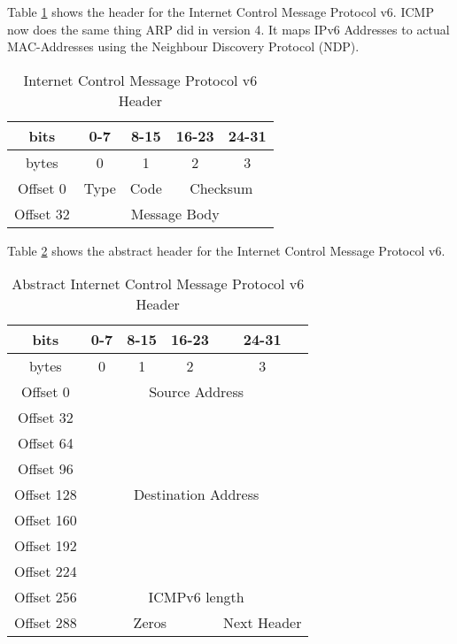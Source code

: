 Table \ref{icmpv6-header} shows the header for the Internet Control Message Protocol v6. ICMP now does the same thing ARP did in version 4. It maps IPv6 Addresses to actual MAC-Addresses using the Neighbour Discovery Protocol (NDP).

\begin{table}[H]
	\centering
	\label{icmpv6-header}
	\begin{tabular}{|c|c|c|c|c|}
		\hline
		bits      & 0-7  & 8-15 & 16-23         & 24-31         \\ \hline
		bytes     & 0    & 1    & 2             & 3             \\ \hline
		Offset 0  & Type & Code & \multicolumn{2}{c|}{Checksum} \\ \hline
		Offset 32 & \multicolumn{4}{c|}{Message Body}           \\ \hline
	\end{tabular}
	\caption{Internet Control Message Protocol v6 Header}
\end{table}

Table \ref{icmpv6-abstract-header} shows the abstract header for the Internet Control Message Protocol v6.
\begin{table}[H]
	\centering
	\label{icmpv6-abstract-header}
	\begin{tabular}{|c|c|c|c|c|}
		\hline
		bits       & 0-7        & 8-15       & 16-23       & 24-31             \\ \hline
		bytes      & 0          & 1          & 2           & 3                 \\ \hline
		Offset 0   & \multicolumn{4}{c|}{Source Address}      \\ \cline{1-1}
		Offset 32  & \multicolumn{4}{c|}{}                                     \\ \cline{1-1}
		Offset 64  & \multicolumn{4}{c|}{}                                     \\ \cline{1-1}
		Offset 96  & \multicolumn{4}{c|}{}                                     \\ \hline
		Offset 128 & \multicolumn{4}{c|}{Destination Address} \\ \cline{1-1}
		Offset 160 & \multicolumn{4}{c|}{}                                     \\ \cline{1-1}
		Offset 192 & \multicolumn{4}{c|}{}                                     \\ \cline{1-1}
		Offset 224 & \multicolumn{4}{c|}{}                                     \\ \hline
		Offset 256 & \multicolumn{4}{c|}{ICMPv6 length}                        \\ \hline
		Offset 288 & \multicolumn{3}{c|}{Zeros}            & Next Header       \\ \hline
	\end{tabular}
	\caption{Abstract Internet Control Message Protocol v6 Header}
\end{table}
